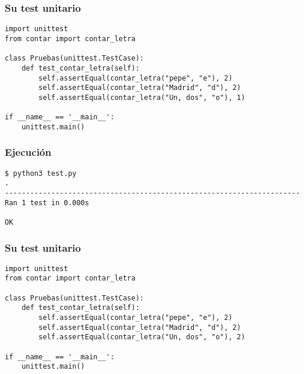 
\begin{frame}[fragile]
\frametitle{Su test unitario}

\begin{verbatim}
import unittest
from contar import contar_letra

class Pruebas(unittest.TestCase):
    def test_contar_letra(self):
        self.assertEqual(contar_letra("pepe", "e"), 2)
        self.assertEqual(contar_letra("Madrid", "d"), 2)
        self.assertEqual(contar_letra("Un, dos", "o"), 1)        

if __name__ == '__main__':
    unittest.main()
\end{verbatim}

\end{frame}


\begin{frame}[fragile]
\frametitle{Ejecución}

\begin{verbatim}
$ python3 test.py 
.
----------------------------------------------------------------------
Ran 1 test in 0.000s

OK
\end{verbatim}

\end{frame}


\begin{frame}[fragile]
\frametitle{Su test unitario}

\begin{verbatim}
import unittest
from contar import contar_letra

class Pruebas(unittest.TestCase):
    def test_contar_letra(self):
        self.assertEqual(contar_letra("pepe", "e"), 2)
        self.assertEqual(contar_letra("Madrid", "d"), 2)
        self.assertEqual(contar_letra("Un, dos", "o"), 2)        

if __name__ == '__main__':
    unittest.main()
\end{verbatim}

\end{frame}



